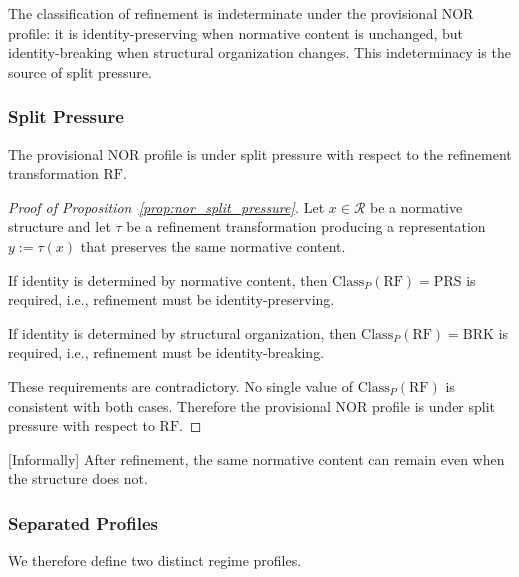 The classification of refinement is indeterminate under the provisional NOR profile:
it is identity-preserving when normative content is unchanged,
but identity-breaking when structural organization changes.
This indeterminacy is the source of split pressure.


\subsubsection{Split Pressure}

\begin{proposition}
\label{prop:nor_split_pressure}
The provisional NOR profile is under split pressure with respect to
the refinement transformation $\mathrm{RF}$.
\end{proposition}

\begin{proof}[Proof of Proposition~\ref{prop:nor_split_pressure}]
Let $x \in \mathcal{R}$ be a normative structure and let $\tau$ be a
refinement transformation producing a representation
$y := \tau(x)$ that preserves the same normative content.

If identity is determined by normative content,
then $\mathrm{Class}_P(\mathrm{RF}) = \mathrm{PRS}$ is required,
i.e., refinement must be identity-preserving.

If identity is determined by structural organization,
then $\mathrm{Class}_P(\mathrm{RF}) = \mathrm{BRK}$ is required,
i.e., refinement must be identity-breaking.

These requirements are contradictory.
No single value of $\mathrm{Class}_P(\mathrm{RF})$ is consistent with both cases.
Therefore the provisional NOR profile is under split pressure with respect to $\mathrm{RF}$.
\end{proof}

[Informally]
After refinement, the same normative content can remain
even when the structure does not.


\subsubsection{Separated Profiles}

We therefore define two distinct regime profiles.

